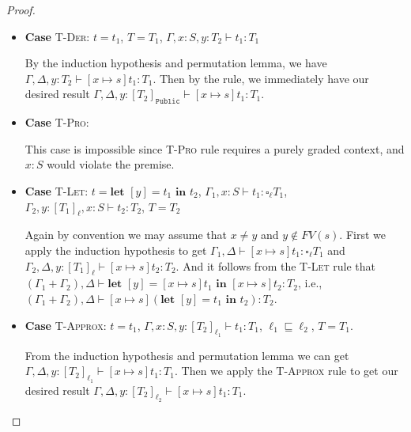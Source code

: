 \documentclass[conference]{IEEEtran}
\newcommand\unp[3]{\textbf{let }[#1]=#2\textbf{ in }#3}
\newcommand\gradedt[2]{\square_#1 #2}
\newcommand\public{\texttt{Public}}
\begin{document}
\begin{proof}
\begin{itemize}
		\item\textbf{Case} \textsc{T-Der}: $t=t_1$, $T=T_1$, $\Gamma,x:S,y:T_2\vdash t_1:T_1$
		
		By the induction hypothesis and permutation lemma, we have $\Gamma,\Delta,y:T_2\vdash [x\mapsto s]t_1:T_1$. Then by the  rule, we immediately have our desired result $\Gamma,\Delta,y:[T_2]_\public\vdash [x\mapsto s]t_1:T_1$.
		
		\item\textbf{Case} \textsc{T-Pro}:
		
		This case is impossible since \textsc{T-Pro} rule requires a purely graded context, and $x:S$ would violate the premise.
		
		\item\textbf{Case} \textsc{T-Let}: $t=\unp{y}{t_1}{t_2}$, $\Gamma_1,x:S\vdash t_1:\gradedt{\ell}{T_1}$, $\Gamma_2,y:[T_1]_\ell,x:S\vdash t_2:T_2$, $T=T_2$
		
		Again by convention we may assume that $x\ne y$ and $y\notin FV(s)$. First we apply the induction hypothesis to get $\Gamma_1,\Delta\vdash [x\mapsto s]t_1:\gradedt{\ell}{T_1}$ and $\Gamma_2,\Delta,y:[T_1]_\ell\vdash [x\mapsto s]t_2:T_2$. And it follows from the \textsc{T-Let} rule that $(\Gamma_1+\Gamma_2),\Delta\vdash\unp{y}{[x\mapsto s]t_1}{[x\mapsto s]t_2}:T_2$, i.e., $(\Gamma_1+\Gamma_2),\Delta\vdash[x\mapsto s](\unp{y}{t_1}{t_2}):T_2$.
		
		\item\textbf{Case} \textsc{T-Approx}: $t=t_1$, $\Gamma,x:S,y:[T_2]_{\ell_1}\vdash t_1:T_1$, $\ell_1\sqsubseteq\ell_2$, $T=T_1$.
		
		From the induction hypothesis and permutation lemma we can get $\Gamma,\Delta,y:[T_2]_{\ell_1}\vdash[x\mapsto s]t_1:T_1$. Then we apply the \textsc{T-Approx} rule to get our desired result $\Gamma,\Delta,y:[T_2]_{\ell_2}\vdash[x\mapsto s]t_1:T_1$.
	\end{itemize}
\end{proof}
\end{document}
